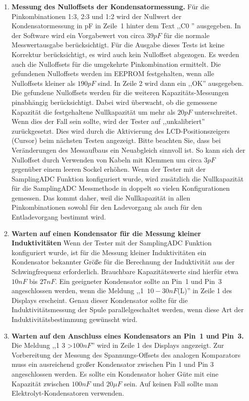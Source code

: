 \begin{enumerate}
\item {\bf Messung des Nulloffsets der Kondensatormessung.}
Für die Pinkombinationen 1:3, 2:3 und 1:2 wird der Nullwert der Kondensatormessung in pF in Zeile~1
hinter dem Text ,,C0 '' ausgegeben.
In der Software wird ein Vorgabewert von circa \(39pF\) für die normale Messwertausgabe berücksichtigt.
Für die Ausgabe dieses Tests ist keine Korrektur berücksichtigt, es wird auch kein Nulloffset abgezogen.
Es werden auch die Nulloffsets für die umgekehrte Pinkombination ermittelt.
Die gefundenen Nulloffsets werden im EEPROM festgehalten, wenn alle Nulloffsets kleiner als \(190pF\) sind.
In Zeile 2 wird dann ein ,,OK'' ausgegeben.
Die gefundene Nulloffsets werden für die weiteren Kapazitäts-Messungen pinabhängig berücksichtigt.
Dabei wird überwacht, ob die gemessene Kapazität die festgehaltene Nullkapazität um mehr als \(20pF\) unterschreitet.
Wenn dies der Fall sein sollte, wird der Tester auf ,,unkalibriert'' zurückgesetzt.
Dies wird durch die Aktivierung des LCD-Positionszeigers (Cursor) beim nächsten Testen angezeigt.
Bitte beachten Sie, dass bei Veränderungen des Messaufbaus ein Neuabgleich sinnvoll ist.
So kann sich der Nulloffset durch Verwenden von Kabeln mit Klemmen um circa \(3pF\) gegenüber einem leeren
Sockel erhöhen.
Wenn der Tester mit der SamplingADC Funktion konfiguriert wurde, wird zusätzlich die Nullkapazität
für die SamplingADC Messmethode in doppelt so vielen Konfigurationen gemessen. 
Das kommt daher, weil die Nullkapazität in allen Pinkombinationen sowohl für den Ladevorgang als
auch für den Entladevorgang bestimmt wird.

\item {\bf Warten auf einen Kondensator für die Messung kleiner Induktivitäten}
Wenn der Tester mit der SamplingADC Funktion konfiguriert wurde, ist für die Messung kleiner Induktivitäten
ein Kondensator bekannter Größe für die Berechnung der Induktivität aus der Schwingfrequenz erforderlich.
Brauchbare Kapazitätswerte sind hierfür etwa \(10nF\) bis \(27nF\). Ein geeigneter Kondensator
sollte an Pin~1 und Pin~3 angeschlossen werden, wenn die Meldung ,,\mbox{1  \(10-30nF\)(L)}'' in Zeile 1 des
Displays erscheint. Genau dieser Kondensator sollte für die Induktivitätsmessung der Spule
parallelgeschaltet werden, wenn diese Art der Induktivitätsbestimmung gewünscht wird.

\item {\bf Warten auf den Anschluss eines Kondensators an Pin~1 und Pin~3.}
Die Meldung ,,1 \mbox{\electricC}3 \textgreater \(100nF\)'' wird in Zeile 1 des Displays angezeigt.
Zur Vorbereitung der Messung des Spannungs-Offsets des analogen Komparators muss ein ausreichend großer
Kondensator zwischen Pin 1 und Pin 3 angeschlossen werden.
Es sollte ein Kondensator hoher Güte mit eine Kapazität zwischen \(100nF\) und \(20\mu F\) sein. 
Auf keinen Fall sollte man Elektrolyt-Kondensatoren verwenden.



\end{enumerate}
